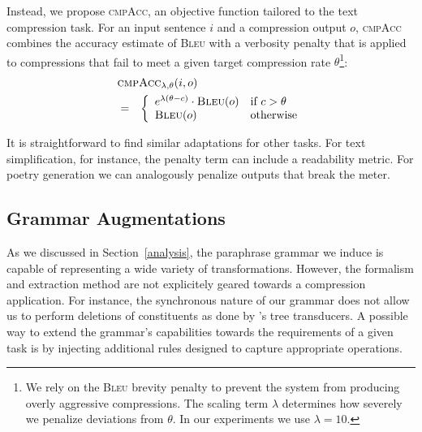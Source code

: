 \documentclass[11pt]{article}
\begin{document}
Instead, we propose \textsc{cmpAcc}, an objective function tailored to
the text compression task. For an input sentence $i$ and a compression
output $o$, \textsc{cmpAcc} combines the accuracy estimate of
\textsc{Bleu} with a verbosity penalty that is applied to compressions
that fail to meet a given target compression rate $\theta$\footnote{We
  rely on the \textsc{Bleu} brevity penalty to prevent the system from
  producing overly aggressive compressions. The scaling term $\lambda$
  determines how severely we penalize deviations from $\theta$. In our
experiments we use $\lambda = 10$.}:
\begin{eqnarray}
  \lefteqn{ \textsc{cmpAcc}_{\lambda,\theta} (i, o) } \nonumber \\
  &=& \left\{ \begin{array}{ll}
      e^{\lambda (\theta - c)} \cdot \textsc{Bleu}(o) & \textrm{if
        $c > \theta$} \nonumber \\ 
      \textsc{Bleu}(o) & \textrm{otherwise}
\end{array} \right.
\end{eqnarray}

It is straightforward to find similar adaptations for other tasks. For
text simplification, for instance, the penalty term can include a
readability metric. For poetry generation we can analogously penalize
outputs that break the meter.


\subsection{Grammar Augmentations} \label{injection}

As we discussed in Section~\ref{analysis}, the paraphrase grammar we
induce is capable of representing a wide variety of
transformations. However, the formalism and extraction method are not
explicitely geared towards a compression application. For instance,
the synchronous nature of our grammar does not allow us to perform
deletions of constituents as done by 's tree
transducers.  A possible way to extend the grammar's capabilities
towards the requirements of a given task is by injecting additional
rules designed to capture appropriate operations.
\end{document}
